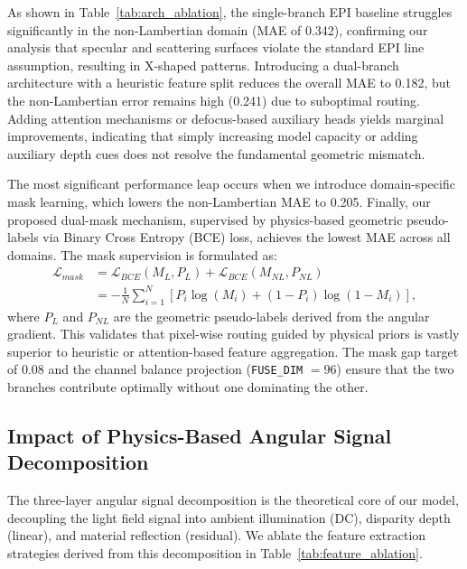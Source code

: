 As shown in Table~\ref{tab:arch_ablation}, the single-branch EPI baseline struggles significantly in the non-Lambertian domain (MAE of 0.342), confirming our analysis that specular and scattering surfaces violate the standard EPI line assumption, resulting in X-shaped patterns. Introducing a dual-branch architecture with a heuristic feature split reduces the overall MAE to 0.182, but the non-Lambertian error remains high (0.241) due to suboptimal routing. Adding attention mechanisms or defocus-based auxiliary heads yields marginal improvements, indicating that simply increasing model capacity or adding auxiliary depth cues does not resolve the fundamental geometric mismatch. 

The most significant performance leap occurs when we introduce domain-specific mask learning, which lowers the non-Lambertian MAE to 0.205. Finally, our proposed dual-mask mechanism, supervised by physics-based geometric pseudo-labels via Binary Cross Entropy (BCE) loss, achieves the lowest MAE across all domains. The mask supervision is formulated as:
\begin{align}
\mathcal{L}_{mask} &= \mathcal{L}_{BCE}(M_L, P_{L}) + \mathcal{L}_{BCE}(M_{NL}, P_{NL}) \label{eq:ch4_2} \\
&= - \frac{1}{N} \sum_{i=1}^{N} \left[ P_i \log(M_i) + (1-P_i) \log(1-M_i) \right], \nonumber
\end{align}
where $P_L$ and $P_{NL}$ are the geometric pseudo-labels derived from the angular gradient. This validates that pixel-wise routing guided by physical priors is vastly superior to heuristic or attention-based feature aggregation. The mask gap target of $0.08$ and the channel balance projection (\texttt{FUSE\_DIM} $= 96$) ensure that the two branches contribute optimally without one dominating the other.

\subsection{Impact of Physics-Based Angular Signal Decomposition}

The three-layer angular signal decomposition is the theoretical core of our model, decoupling the light field signal into ambient illumination (DC), disparity depth (linear), and material reflection (residual). We ablate the feature extraction strategies derived from this decomposition in Table~\ref{tab:feature_ablation}.

